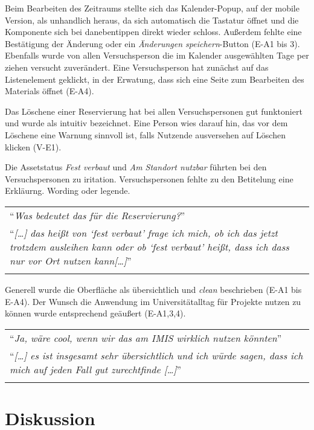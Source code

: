  Beim Bearbeiten des Zeitraums stellte sich das Kalender-Popup, auf der mobile Version, als
unhandlich heraus, da sich automatisch die Tastatur öffnet und die Komponente sich bei danebentippen
direkt wieder schloss. Außerdem fehlte eine Bestätigung der Änderung oder ein \textit{Änderungen
speichern}-Button (E-A1 bis 3). Ebenfalls wurde von allen Versuchsperson die im Kalender
ausgewählten Tage per ziehen versucht zuverändert. Eine Versuchsperson hat zunächst auf das
Listenelement geklickt, in der Erwatung, dass sich eine Seite zum Bearbeiten des Materials öffnet
(E-A4).

Das Löschene einer Reservierung hat bei allen Versuchspersonen gut funktoniert und wurde als
intuitiv bezeichnet. Eine Person wies darauf hin, das vor dem Löschene eine Warnung sinnvoll ist,
falls Nutzende ausversehen auf Löschen klicken (V-E1). 

Die Assetstatus \textit{Fest verbaut} und \textit{Am Standort nutzbar} führten bei den
Versuchspersonen zu iritation. Versuchspersonen fehlte zu den Betitelung eine Erkläurng.  Wording oder legende.

\begin{longtable}{p{}} 
  \arrayrulecolor{maincolor}\hline
  \enquote{\textit{Was bedeutet das für die Reservierung?}} \\
  \enquote{\textit{[\dots] das heißt von \enquote{fest verbaut} frage ich mich, ob ich das jetzt trotzdem
  ausleihen kann oder ob \enquote{fest verbaut} heißt, dass ich dass nur vor Ort nutzen kann[\dots]}}
  \\
  \arrayrulecolor{maincolor}\hline
\end{longtable}

Generell wurde die Oberfläche als übersichtlich und \textit{clean} beschrieben (E-A1 bis E-A4). Der Wunsch die
Anwendung im Universitätalltag für Projekte nutzen zu können wurde entsprechend geäußert (E-A1,3,4).

\begin{longtable}{p{}} 
  \arrayrulecolor{maincolor}\hline
  \enquote{\textit{Ja, wäre cool, wenn wir das am IMIS wirklich nutzen könnten}}\\
  \enquote{\textit{[\dots] es ist insgesamt sehr übersichtlich und ich würde sagen, dass ich mich auf jeden
  Fall gut zurechtfinde [\dots]}} \\
  \arrayrulecolor{maincolor}\hline
\end{longtable}

\section{Diskussion}